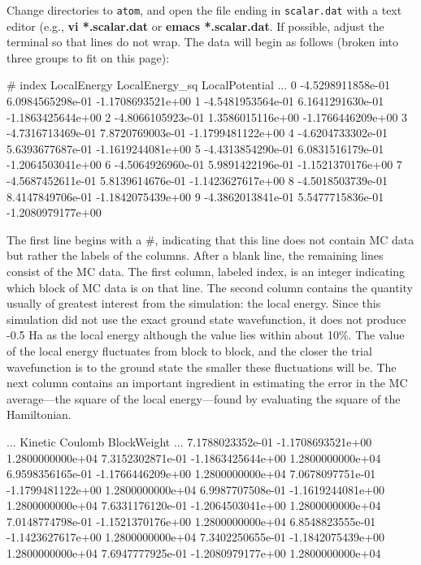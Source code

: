 Change directories to \texttt{atom}, and open the file ending in
\texttt{scalar.dat} with a text editor (e.g., \textbf{vi *.scalar.dat} or \textbf{emacs
*.scalar.dat}.  If possible, adjust the terminal so that lines do not wrap.
The data will begin as follows (broken into three groups to fit on this page):

\begin{shade}
#   index    LocalEnergy         LocalEnergy_sq      LocalPotential     ...
         0   -4.5298911858e-01    6.0984565298e-01   -1.1708693521e+00    
         1   -4.5481953564e-01    6.1641291630e-01   -1.1863425644e+00    
         2   -4.8066105923e-01    1.3586015116e+00   -1.1766446209e+00    
         3   -4.7316713469e-01    7.8720769003e-01   -1.1799481122e+00    
         4   -4.6204733302e-01    5.6393677687e-01   -1.1619244081e+00    
         5   -4.4313854290e-01    6.0831516179e-01   -1.2064503041e+00    
         6   -4.5064926960e-01    5.9891422196e-01   -1.1521370176e+00    
         7   -4.5687452611e-01    5.8139614676e-01   -1.1423627617e+00    
         8   -4.5018503739e-01    8.4147849706e-01   -1.1842075439e+00    
         9   -4.3862013841e-01    5.5477715836e-01   -1.2080979177e+00    
\end{shade}

The first line begins with a \#, indicating that this line does not contain MC
data but rather the labels of the columns.  After a blank line, the remaining
lines consist of the MC data.  The first column, labeled index, is an integer
indicating which block of MC data is on that line.  The second column contains
the quantity usually of greatest interest from the simulation: the local
energy.  Since this simulation did not use the exact ground state wavefunction, it does not produce -0.5 Ha as the local energy although the
value lies within about 10\%.  The value of the local energy fluctuates from
block to block, and the closer the trial wavefunction is to the ground state
the smaller these fluctuations will be.  The next column contains an important
ingredient in estimating the error in the MC average---the square of the local
energy---found by evaluating the square of the Hamiltonian.  

\begin{shade} 
...   Kinetic             Coulomb             BlockWeight        ... 
       7.1788023352e-01   -1.1708693521e+00    1.2800000000e+04   
       7.3152302871e-01   -1.1863425644e+00    1.2800000000e+04   
       6.9598356165e-01   -1.1766446209e+00    1.2800000000e+04   
       7.0678097751e-01   -1.1799481122e+00    1.2800000000e+04   
       6.9987707508e-01   -1.1619244081e+00    1.2800000000e+04   
       7.6331176120e-01   -1.2064503041e+00    1.2800000000e+04   
       7.0148774798e-01   -1.1521370176e+00    1.2800000000e+04   
       6.8548823555e-01   -1.1423627617e+00    1.2800000000e+04   
       7.3402250655e-01   -1.1842075439e+00    1.2800000000e+04   
       7.6947777925e-01   -1.2080979177e+00    1.2800000000e+04   
\end{shade}

